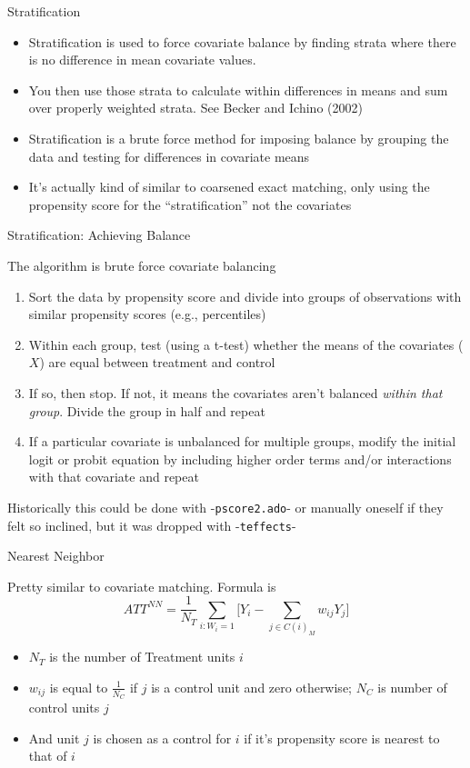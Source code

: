 \documentclass{beamer}
\begin{document}
\begin{frame}{Stratification}
	
	\begin{itemize}
	\item Stratification is used to force covariate balance by finding strata where there is no difference in mean covariate values. 
	\item You then use those strata to calculate within differences in means and sum over properly weighted strata. See Becker and Ichino (2002)
	\item  Stratification is a brute force method for imposing balance by grouping the data and testing for differences in covariate means
	\item It's actually kind of similar to coarsened exact matching, only using the propensity score for the ``stratification'' not the covariates
	\end{itemize}
	
\end{frame}


\begin{frame}{Stratification: Achieving Balance}
	
The algorithm is brute force covariate balancing
	\begin{enumerate}
		\item Sort the data by propensity score and divide into groups of observations with similar propensity scores (e.g., percentiles)
		\item Within each group, test (using a t-test) whether the means of the covariates ($X$) are equal between treatment and control
		\item If so, then stop.  If not, it means the covariates aren't balanced \emph{within that group}.  Divide the group in half and repeat
		\item If a particular covariate is unbalanced for multiple groups, modify the initial logit or probit equation by including higher order terms and/or interactions with that covariate and repeat
		\end{enumerate}
Historically this could be done with -\texttt{pscore2.ado}- or manually oneself if they felt so inclined, but it was dropped with -\texttt{teffects}-
\end{frame}


\begin{frame}{Nearest Neighbor}
	
	Pretty similar to covariate matching.  Formula is $$ATT^{NN} = \frac{1}{N_T} \sum_{i:W_i=1} \bigg [ Y_i - \sum_{j \in C(i)_M} w_{ij}Y_j \bigg ]$$ 
		\begin{itemize}
		\item $N_T$ is the number of Treatment units $i$
		\item $w_{ij}$ is equal to $\frac{1}{N_C}$ if $j$ is a control unit and zero otherwise; $N_C$ is number of control units $j$
		\item And unit $j$ is chosen as a control for $i$ if it's propensity score is nearest to that of $i$
		\end{itemize}
\end{frame}
\end{document}
